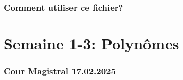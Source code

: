 \documentclass{article}
\begin{document}
\newpage
\section*{Comment utiliser ce fichier?}


\newpage
\tableofcontents

\newpage

\part{Semaine 1-3: Polynômes}



\section{Cour Magistral 17.02.2025}
\end{document}
